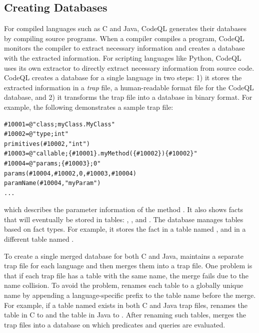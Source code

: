 \subsection{Creating Databases}
For compiled languages such as C and Java, CodeQL generates their databases by
compiling source programs.  When a compiler compiles a program, CodeQL monitors
the compiler to extract necessary information and creates a database with the
extracted information. For scripting languages like Python, CodeQL uses its own
extractor to directly extract necessary information from source code.  CodeQL
creates a database for a single language in two steps: 1) it stores the
extracted information in a \textit{trap} file, a human-readable format file for
the CodeQL database, and 2) it transforms the trap file into a database in
binary format.  For example, the following demonstrates a sample trap file:

\begin{lstlisting}[style=java,numbers=none]
#10001=@"class;myClass.MyClass"
#10002=@"type;int"
primitives(#10002,"int")
#10003=@"callable;{#10001}.myMethod({#10002}){#10002}"
#10004=@"params;{#10003};0"
params(#10004,#10002,0,#10003,#10004)
paramName(#10004,"myParam")
...
\end{lstlisting}

\noindent
which describes the parameter information of the method .
It also shows facts that will eventually be stored in tables:
, , and
.  The database manages tables based on fact types.
For example, it stores the fact  in a table named
, and  in a different table named
.

To create a single merged database for both C and Java, \ours maintains a
separate trap file for each language and then merges them into a trap file.
One problem is that if each trap file has a table with the same name, the merge
fails due to the name collision.  To avoid the problem, \ours renames each
table to a globally unique name by appending a language-specific prefix to the
table name before the merge.  For example, if a table named 
exists in both C and Java trap files, \ours renames the table in C to
 and the table in Java to .  After
renaming such tables, \ours merges the trap files into a database on which
predicates and queries are evaluated.


